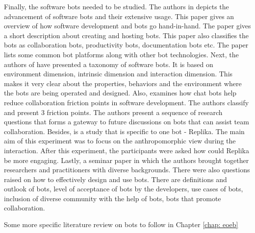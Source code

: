 Finally, the software bots needed to be studied. The authors in \cite{lebeuf_software_2018} depicts the advancement of software bots and their extensive usage. This paper gives an overview of how software development and bots go hand-in-hand. The paper gives a short description about creating and hosting bots. This paper also classifies the bots as collaboration bots, productivity bots, documentation bots etc. The paper lists some common bot platforms along with other bot technologies. Next, the authors of \cite{lebeuf_defining_2019} have presented a taxonomy of software bots. It is based on environment dimension, intrinsic dimension and interaction dimension. This makes it very clear about the properties, behaviors and the environment where the bots are being operated and designed. Also, \cite{lebeuf_how_nodate} examines how chat bots help reduce collaboration friction points in software development. The authors classify and present 3 friction points.  The authors present a sequence of research questions that forms a gateway to future discussions on bots that can assist team collaboration. Besides, \cite{muresan_chats_2019} is a study that is specific to one bot - Replika. The main aim of this experiment was to focus on the anthropomorphic view during the interaction. After this experiment, the participants were asked how could Replika be more engaging. Lastly, a seminar paper \cite{storey_botse_nodate} in which the authors brought together researchers and practitioners with diverse backgrounds. There were also questions raised on how to effectively design and use bots. There are definitions and outlook of bots, level of acceptance of bots by the developers, use cases of bots, inclusion of diverse community with the help of bots, bots that promote collaboration.

Some more specific literature review on bots to follow in Chapter \ref{chap: eoeb}








 
